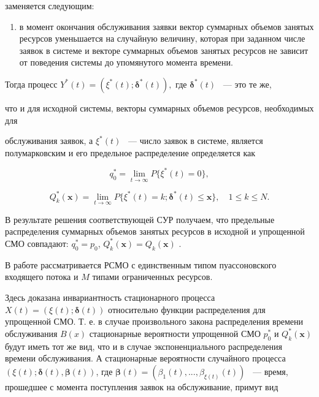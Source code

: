 \documentclass[a4paper,12pt]{article}
\begin{document}
заменяется следующим:

\begin{enumerate}

\item[*] в момент окончания обслуживания заявки вектор суммарных объемов занятых ресурсов уменьшается на случайную величину, которая при заданном числе заявок в системе и векторе суммарных объемов занятых ресурсов не зависит от поведения системы до упомянутого момента времени.

\end{enumerate}



Тогда процесс $Y^*(t)=(\xi^*(t);\boldsymbol{\delta}^*(t)),$ где $\boldsymbol{\delta}^*(t)$ ~--- это те же,

что и для исходной системы, векторы суммарных объемов ресурсов, необходимых для

обслуживания заявок, а $\xi^*(t)$ ~--- число заявок в системе, является полумарковским и его предельное распределение определяется как

\begin{equation}

q_0^*=\lim_{t\rightarrow \infty}P\{\xi^*(t)=0\},

\end{equation}

\begin{equation}

Q_k^*(\mathbf{x})=\lim_{t\rightarrow \infty}P\{\xi^*(t)=k; \boldsymbol{\delta}^*(t) \leq \mathbf{x}\}, \quad 1\leq k\leq N.

\end{equation}

В результате решения соответствующей СУР получаем, что предельные распределения суммарных объемов занятых ресурсов в исходной и упрощенной СМО совпадают: $q_0^*=p_0$, $Q_k^*(\mathbf{x})=Q_k(\mathbf{x})$ \cite{Naumov_3_2016}.



В работе \cite{Sopin_16_2018} рассматривается РСМО с единственным типом пуассоновского входящего потока и $M$ типами ограниченных ресурсов.

Здесь доказана инвариантность стационарного процесса $X(t)=(\xi(t);\boldsymbol{\delta}(t))$ относительно функции распределения для упрощенной СМО. Т. е. в случае произвольного закона распределения времени обслуживания $B(x)$ стационарные вероятности упрощенной СМО $p^{*}_0$ и $Q^{*}_k(\mathbf{x})$ будут иметь тот же вид, что и в случае экспоненциального распределения времени обслуживания. А стационарные вероятности случайного процесса $(\xi(t);\boldsymbol{\delta}(t), \boldsymbol{\beta}(t))$, где $\boldsymbol{\beta}(t)=(\beta_1(t),...,\beta_{\xi(t)}(t))$ ~--- время, прошедшее с момента поступления заявок на обслуживание, примут вид
\end{document}
